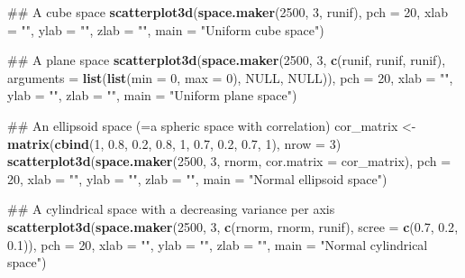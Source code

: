 \documentclass[]{book}
\newenvironment{Shaded}{\begin{snugshade}}{\end{snugshade}}
\newcommand{\KeywordTok}[1]{\textcolor[rgb]{0.13,0.29,0.53}{\textbf{#1}}}
\newcommand{\DataTypeTok}[1]{\textcolor[rgb]{0.13,0.29,0.53}{#1}}
\newcommand{\DecValTok}[1]{\textcolor[rgb]{0.00,0.00,0.81}{#1}}
\newcommand{\FloatTok}[1]{\textcolor[rgb]{0.00,0.00,0.81}{#1}}
\newcommand{\StringTok}[1]{\textcolor[rgb]{0.31,0.60,0.02}{#1}}
\newcommand{\OtherTok}[1]{\textcolor[rgb]{0.56,0.35,0.01}{#1}}
\newcommand{\NormalTok}[1]{#1}
\theoremstyle{definition}
\theoremstyle{definition}
\theoremstyle{remark}
\begin{document}
\begin{Shaded}
\begin{Highlighting}[]
\NormalTok{## A cube space}
\KeywordTok{scatterplot3d}\NormalTok{(}\KeywordTok{space.maker}\NormalTok{(}\DecValTok{2500}\NormalTok{, }\DecValTok{3}\NormalTok{, runif), }\DataTypeTok{pch =} \DecValTok{20}\NormalTok{,}
              \DataTypeTok{xlab =} \StringTok{""}\NormalTok{, }\DataTypeTok{ylab =} \StringTok{""}\NormalTok{, }\DataTypeTok{zlab =} \StringTok{""}\NormalTok{,}
              \DataTypeTok{main =} \StringTok{"Uniform cube space"}\NormalTok{)}

\NormalTok{## A plane space}
\KeywordTok{scatterplot3d}\NormalTok{(}\KeywordTok{space.maker}\NormalTok{(}\DecValTok{2500}\NormalTok{, }\DecValTok{3}\NormalTok{, }\KeywordTok{c}\NormalTok{(runif, runif, runif),}
              \DataTypeTok{arguments =} \KeywordTok{list}\NormalTok{(}\KeywordTok{list}\NormalTok{(}\DataTypeTok{min =} \DecValTok{0}\NormalTok{, }\DataTypeTok{max =} \DecValTok{0}\NormalTok{), }\OtherTok{NULL}\NormalTok{, }\OtherTok{NULL}\NormalTok{)), }\DataTypeTok{pch =} \DecValTok{20}\NormalTok{,}
              \DataTypeTok{xlab =} \StringTok{""}\NormalTok{, }\DataTypeTok{ylab =} \StringTok{""}\NormalTok{, }\DataTypeTok{zlab =} \StringTok{""}\NormalTok{,}
              \DataTypeTok{main =} \StringTok{"Uniform plane space"}\NormalTok{)}

\NormalTok{## An ellipsoid space (=a spheric space with correlation)}
\NormalTok{cor_matrix <-}\StringTok{ }\KeywordTok{matrix}\NormalTok{(}\KeywordTok{cbind}\NormalTok{(}\DecValTok{1}\NormalTok{, }\FloatTok{0.8}\NormalTok{, }\FloatTok{0.2}\NormalTok{, }\FloatTok{0.8}\NormalTok{, }\DecValTok{1}\NormalTok{, }\FloatTok{0.7}\NormalTok{, }\FloatTok{0.2}\NormalTok{, }\FloatTok{0.7}\NormalTok{, }\DecValTok{1}\NormalTok{), }\DataTypeTok{nrow =} \DecValTok{3}\NormalTok{)}
\KeywordTok{scatterplot3d}\NormalTok{(}\KeywordTok{space.maker}\NormalTok{(}\DecValTok{2500}\NormalTok{, }\DecValTok{3}\NormalTok{, rnorm, }\DataTypeTok{cor.matrix =}\NormalTok{ cor_matrix), }\DataTypeTok{pch =} \DecValTok{20}\NormalTok{,}
              \DataTypeTok{xlab =} \StringTok{""}\NormalTok{, }\DataTypeTok{ylab =} \StringTok{""}\NormalTok{, }\DataTypeTok{zlab =} \StringTok{""}\NormalTok{,}
              \DataTypeTok{main =} \StringTok{"Normal ellipsoid space"}\NormalTok{)}

\NormalTok{## A cylindrical space with a decreasing variance per axis}
\KeywordTok{scatterplot3d}\NormalTok{(}\KeywordTok{space.maker}\NormalTok{(}\DecValTok{2500}\NormalTok{, }\DecValTok{3}\NormalTok{, }\KeywordTok{c}\NormalTok{(rnorm, rnorm, runif),}
              \DataTypeTok{scree =} \KeywordTok{c}\NormalTok{(}\FloatTok{0.7}\NormalTok{, }\FloatTok{0.2}\NormalTok{, }\FloatTok{0.1}\NormalTok{)), }\DataTypeTok{pch =} \DecValTok{20}\NormalTok{,}
              \DataTypeTok{xlab =} \StringTok{""}\NormalTok{, }\DataTypeTok{ylab =} \StringTok{""}\NormalTok{, }\DataTypeTok{zlab =} \StringTok{""}\NormalTok{,}
              \DataTypeTok{main =} \StringTok{"Normal cylindrical space"}\NormalTok{)}
\end{Highlighting}
\end{Shaded}
\end{document}
